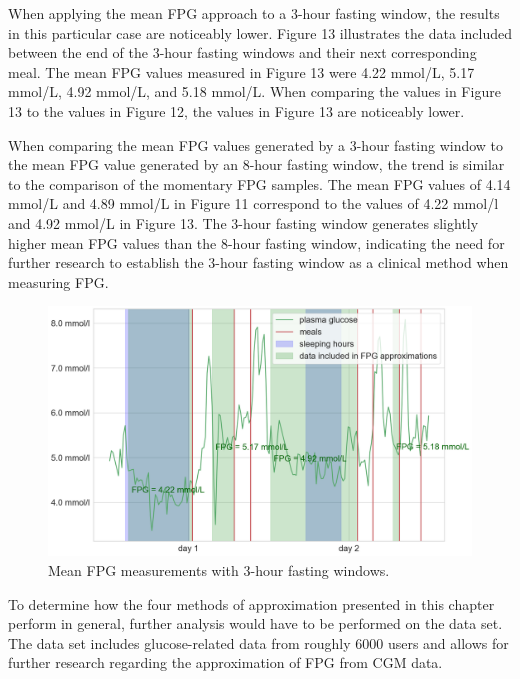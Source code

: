 \documentclass[english, 12pt, a4paper, elec, utf8, a-1b, online]{aaltothesis}
\begin{document}
When applying the mean FPG approach to a 3-hour fasting window, the results in this particular case are noticeably lower. Figure 13 illustrates the data included between the 
end of the 3-hour fasting windows and their next corresponding meal. The mean FPG values measured in Figure 13 were 4.22 mmol/L, 5.17 mmol/L, 4.92 mmol/L, and 5.18 mmol/L. 
When comparing the values in Figure 13 to the values in Figure 12, the values in Figure 13 are noticeably lower. 

When comparing the mean FPG values generated by a 3-hour fasting window to the mean FPG value generated by an 8-hour fasting window, the trend is similar to
the comparison of the momentary FPG samples. The mean FPG values of 4.14 mmol/L and 4.89 mmol/L in Figure 11 correspond to the values of 4.22 mmol/l and 4.92 mmol/L in Figure 13. 
The 3-hour fasting window generates slightly higher mean FPG values than the 8-hour fasting window, indicating the need for further research to establish the 3-hour fasting window as a clinical method when measuring FPG\cite{moebus_impact_2011}.

\begin{figure}[H]
\centering
\includegraphics[width=14cm]{images/user_glucose_and_fpg4.png}
\caption{Mean FPG measurements with 3-hour fasting windows.}
\end{figure} 

To determine how the four methods of approximation presented in this chapter perform in general, further analysis would have to be performed on the data set. The data 
set includes glucose-related data from roughly 6000 users and allows for further research regarding the approximation of FPG from CGM data.
\clearpage


\end{document}
